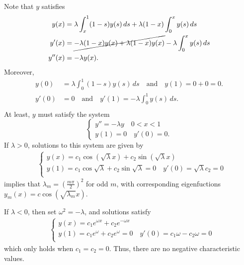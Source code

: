 \documentclass{homework}
\begin{document}
\newpage
{}

\begin{solution}
Note that $y$ satisfies  
\begin{align*}
  y(x)  &= \lambda \int_x^1 (1-s) y(s)\,ds + \lambda (1-x)\int_0^x y(s)\,ds\\
  y'(x) &= \cancel{-\lambda (1-x)y(x) + \lambda(1-x)y(x)} - \lambda\int_0^x y(s)\,ds\\
  y''(x) &= - \lambda y(x).\\
\end{align*}
Moreover,
\begin{align*}
  y(0) &= \lambda\int_0^1(1-s)y(s)\,ds\quad\text{and}\quad y(1) = 0+0 =0.\\
  y'(0) &= 0\quad\text{and}\quad y'(1) = -\lambda\int_0^1y(s)\,ds.\\
\end{align*}
At least, $y$ must satisfy the system
$$
  \begin{cases} 
  y'' = -\lambda y\quad 0< x < 1\\
  y(1) = 0\quad y'(0)=0.
  \end{cases}
$$
If $\lambda > 0$, solutions to this system are given by
\begin{align*}
  &\begin{cases}
  y(x) = c_1 \cos(\sqrt\lambda x) + c_2 \sin(\sqrt\lambda x)\\
  y(1) = c_1 \cos\sqrt\lambda + c_2\sin\sqrt\lambda = 0\quad 
  y'(0) = \sqrt\lambda c_2 = 0\\
  \end{cases}
\end{align*}
implies that $\lambda_m = \left(\frac{m\pi}2\right)^2$ for odd $m$, with corresponding eigenfuctions $y_m(x) = c \cos \left(\sqrt{\lambda_m} x\right)$. 

If $\lambda < 0$, then set $\omega^2 = -\lambda$, and solutions satisfy
\begin{align*}
  &\begin{cases}
  y(x) = c_1 e^{\omega x} + c_2e^{-\omega x}\\
  y(1) = c_1 e^\omega + c_2e^\omega = 0\quad 
  y'(0) = c_1 \omega - c_2 \omega = 0\\
  \end{cases}
\end{align*}
which only holds when $c_1 = c_2 = 0$.  Thus, there are no negative characteristic values.


\end{solution}
\end{document}

